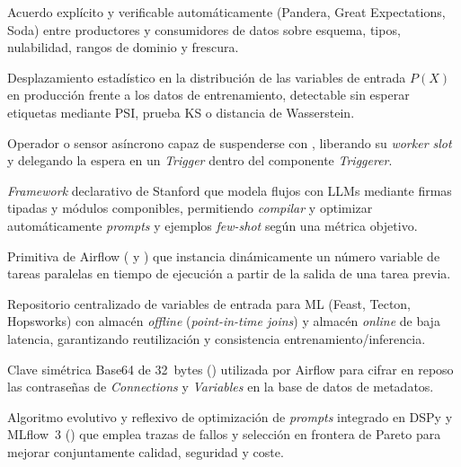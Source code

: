 {\begin{description}[style=standard, itemsep=2pt, parsep=0pt, topsep=4pt, leftmargin=1.1em, font=\sffamily\bfseries\color{PrimaryDark}]
\item[Data Contract.]
Acuerdo explícito y verificable automáticamente (Pandera, Great Expectations, Soda) entre productores y consumidores de datos sobre esquema, tipos, nulabilidad, rangos de dominio y frescura.

\item[Data Drift (Covariate Shift).]
Desplazamiento estadístico en la distribución de las variables de entrada $P(X)$ en producción frente a los datos de entrenamiento, detectable sin esperar etiquetas mediante PSI, prueba KS o distancia de Wasserstein.

\item[Deferrable Operator.]
Operador o sensor asíncrono capaz de suspenderse con , liberando su \textit{worker slot} y delegando la espera en un \textit{Trigger}  dentro del componente \textit{Triggerer}.

\item[DSPy.]
\textit{Framework} declarativo de Stanford que modela flujos con LLMs mediante firmas tipadas y módulos componibles, permitiendo \textit{compilar} y optimizar automáticamente \textit{prompts} y ejemplos \textit{few-shot} según una métrica objetivo.

\item[Dynamic Task Mapping.]
Primitiva de Airflow ( y ) que instancia dinámicamente un número variable de tareas paralelas en tiempo de ejecución a partir de la salida de una tarea previa.

\item[Feature Store.]
Repositorio centralizado de variables de entrada para ML (Feast, Tecton, Hopsworks) con almacén \textit{offline} (\textit{point-in-time joins}) y almacén \textit{online} de baja latencia, garantizando reutilización y consistencia entrenamiento/inferencia.

\item[Fernet Key.]
Clave simétrica Base64 de 32~bytes () utilizada por Airflow para cifrar en reposo las contraseñas de \textit{Connections} y \textit{Variables} en la base de datos de metadatos.

\item[GEPA (Genetic-Pareto Prompt Optimization).]
Algoritmo evolutivo y reflexivo de optimización de \textit{prompts} integrado en DSPy y MLflow~3 () que emplea trazas de fallos y selección en frontera de Pareto para mejorar conjuntamente calidad, seguridad y coste.


\end{description}}
